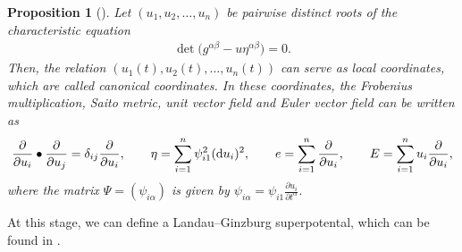 \documentclass[pdftex]{sigma}
\numberwithin{equation}{section}
\newtheorem{Proposition}[Theorem]{Proposition}
 { \theoremstyle{definition}
\newtheorem{Definition}[Theorem]{Definition}
\newtheorem{Remark}[Theorem]{Remark} }
\begin{document}
\begin{Proposition}[\cite{B.Dubrovin2,B.Dubrovin3}]
Let $(u_1,u_2,\dots,u_n)$ be pairwise distinct roots of the characteristic equation
\begin{gather}\label{spectral curve}
\det\bigl(g^{\alpha\beta} -u\eta^{\alpha\beta} \bigr) = 0.
\end{gather}
Then, the relation $(u_1(t),u_2(t),\dots,u_n(t))$ can serve as local coordinates, which are called canonical coordinates. In these coordinates, the Frobenius multiplication, Saito metric, unit vector field and Euler vector field can be written as
\begin{gather}
\frac{\partial}{\partial u_i}\bullet \frac{\partial}{\partial u_j}=\delta_{ij}\frac{\partial}{\partial u_i},\qquad \eta=\sum_{i=1}^{n}\psi_{i1}^2 ({\rm d}u_i)^2, \qquad e=\sum_{i=1}^n\frac{\partial}{\partial u_i},\qquad E=\sum_{i=1}^n u_i\frac{\partial}{\partial u_i},\label{Dubrovin Frobenius structure in canonical coordinates 1}
\end{gather}
where the matrix $\Psi=( \psi_{i\alpha})$ is given by
$
\psi_{i\alpha}=\psi_{i1}\frac{\partial u_i}{\partial t^{\alpha}}$.
\end{Proposition}
At this stage, we can define a Landau--Ginzburg superpotental, which can be found in \cite[Definition~5.7]{B.Dubrovin3}.
\end{document}
